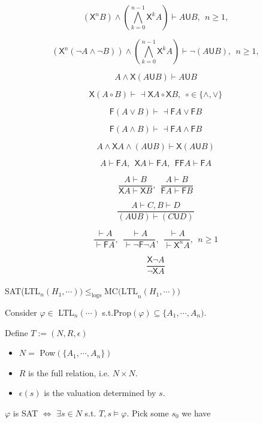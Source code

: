 \documentclass[12pt]{article}
\begin{document}
\begin{CJK*}{GBK}{song}
$$(\textsf{X}^nB)\wedge \left(\bigwedge^{n-1}_{k=0}\textsf{X}^kA\right)\vdash A\textsf{U}B,\ \ n\geq 1, $$ %

$$(\textsf{X}^n(\neg A\wedge\neg B))\wedge \left(\bigwedge^{n-1}_{k=0}\textsf{X}^kA\right)\vdash \neg (A\textsf{U}B),\ \ n\geq 1, $$ %


$${A\wedge \textsf{X}(A\textsf{U}B)}\vdash {A\textsf{U}B}$$

$$\textsf{X}(A\circ B)\vdash\dashv \textsf{X}A\circ\textsf{X}B,\ \ \circ\in\{\wedge,\vee\}$$

$$\textsf{F}(A\vee B)\vdash \dashv \textsf{F}A\vee\textsf{F}B$$ %

$$\textsf{F}(A\wedge B)\vdash \dashv \textsf{F}A\wedge\textsf{F}B$$ %

$${A\wedge\textsf{X}A\wedge (A\textsf{U}B)}\vdash {\textsf{X}(A\textsf{U}B)}$$

$${A}\vdash {\textsf{F}A},\ \ {\textsf{X}A}\vdash {\textsf{F}A},\ \ {\textsf{FF}A}\vdash {\textsf{F}A}$$

$$\frac{A\vdash B}{\textsf{X}A\vdash \textsf{X}B},\ \ \frac{A\vdash B}{\textsf{F}A\vdash \textsf{F}B}  $$

$$\frac{A\vdash C, B\vdash D}{(A\textsf{U}B)\vdash (C\textsf{U}D)}$$

$$\frac{\vdash A}{\vdash \textsf{F}A}, \ \ \frac{\vdash A}{\vdash \neg \textsf{F}\neg A},\ \ \frac{\vdash A}{\vdash \textsf{X}^nA},\ \ n\geq 1$$


$$\frac{\textsf{X}\neg A}{\neg \textsf{X}A}$$
\ \\

SAT(LTL$_n(H_1,\cdots))\leq_{\text{logs}}\mbox{MC(LTL}_n(H_1,\cdots))$

Consider $\varphi\in$ LTL$_n(\cdots)$ s.t.Prop$(\varphi)\subseteq\{A_1,\cdots, A_n)$.

Define $T:=(N, R, \epsilon)$ 

\begin{itemize}
\item $N=$ Pow$(\{A_1,\cdots, A_n\})$

\item $R$ is the full relation, i.e. $N\times N$.

\item $\epsilon(s)$ is the valuation determined by $s$.
\end{itemize}

$\varphi$ is SAT  $\Longleftrightarrow$ $\exists s\in N$ s.t. $T,s\models \varphi$. Pick some $s_0$ we have


\end{CJK*}
\end{document}
